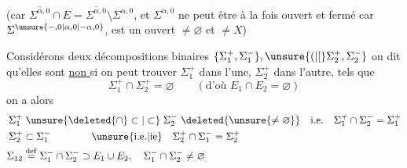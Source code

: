 \reversemarginpar{}\normalmarginpar%
(car $\overline{\Sigma^{\alpha,0}}\cap E=\overline{\Sigma^{\alpha,0}}\setminus\Sigma^{\alpha,0}$, et $\Sigma^{\alpha,0}$ ne peut être à la fois ouvert et fermé car $\Sigma^{\unsure{-,0|\alpha,0|-\alpha,0}}$, est un ouvert $\ne\varnothing$ et $\ne X$)

Considérons deux décompositions binaires $\{\Sigma_1^{+},\Sigma_1^{-}\},\unsure{(|[}\Sigma_2^{+},\Sigma_2^{-}\}$   on dit qu'elles sont \uline{non } si  on peut trouver $\Sigma_1^{+}$ dans l'une, $\Sigma_2^{+}$ dans l'autre, tels que
\[
\Sigma_1^{+}\cap\Sigma_2^{+}=\varnothing\qquad(\text{d'où }E_1\cap E_2=\varnothing)
\]
on a alors
\[
\begin{aligned}
\Sigma_1^{+}&\mathrel{\unsure{\deleted{\cap}\subset|\subset}}\Sigma_2^{-}\ \deleted{\unsure{\ne\varnothing}}\quad\text{i.e.}\quad\Sigma_1^{+}\cap\Sigma_2^{-}=\Sigma_1^{+}\\
\Sigma_2^{+}&\subset\Sigma_1^{-}\qquad\qquad\text{\unsure{i.e.|ie}}\quad\Sigma_2^{+}\cap\Sigma_1^{-}=\Sigma_2^{+}\\
\Sigma_{12}&\overset{\mathrm{def}}{=}\Sigma_1^{-}\cap\Sigma_2^{-}\supset E_1\cup E_2,\quad\Sigma_1^{-}\cap\Sigma_2^{-}\ne\varnothing
\end{aligned}
\]
